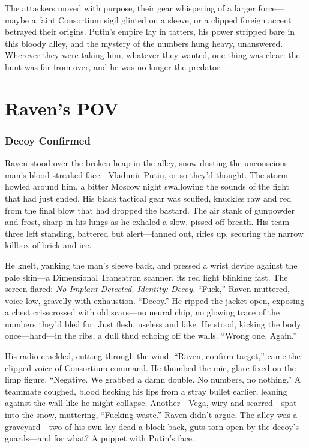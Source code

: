 \documentclass[12pt]{book}
\begin{document}
The attackers moved with purpose, their gear whispering of a larger force—maybe a faint Consortium sigil glinted on a sleeve, or a clipped foreign accent betrayed their origins. Putin’s empire lay in tatters, his power stripped bare in this bloody alley, and the mystery of the numbers hung heavy, unanswered. Wherever they were taking him, whatever they wanted, one thing was clear: the hunt was far from over, and he was no longer the predator.

\chapter{Raven’s POV}

\subsection{Decoy Confirmed}

Raven stood over the broken heap in the alley, snow dusting the unconscious man’s blood-streaked face—Vladimir Putin, or so they’d thought. The storm howled around him, a bitter Moscow night swallowing the sounds of the fight that had just ended. His black tactical gear was scuffed, knuckles raw and red from the final blow that had dropped the bastard. The air stank of gunpowder and frost, sharp in his lungs as he exhaled a slow, pissed-off breath. His team—three left standing, battered but alert—fanned out, rifles up, securing the narrow killbox of brick and ice.

He knelt, yanking the man’s sleeve back, and pressed a wrist device against the pale skin—a Dimensional Transatron scanner, its red light blinking fast. The screen flared: \textit{No Implant Detected. Identity: Decoy.} “Fuck,” Raven muttered, voice low, gravelly with exhaustion. “Decoy.” He ripped the jacket open, exposing a chest crisscrossed with old scars—no neural chip, no glowing trace of the numbers they’d bled for. Just flesh, useless and fake. He stood, kicking the body once—hard—in the ribs, a dull thud echoing off the walls. “Wrong one. Again.”

His radio crackled, cutting through the wind. “Raven, confirm target,” came the clipped voice of Consortium command. He thumbed the mic, glare fixed on the limp figure. “Negative. We grabbed a damn double. No numbers, no nothing.” A teammate coughed, blood flecking his lips from a stray bullet earlier, leaning against the wall like he might collapse. Another—Vega, wiry and scarred—spat into the snow, muttering, “Fucking waste.” Raven didn’t argue. The alley was a graveyard—two of his own lay dead a block back, guts torn open by the decoy’s guards—and for what? A puppet with Putin’s face.
\end{document}
